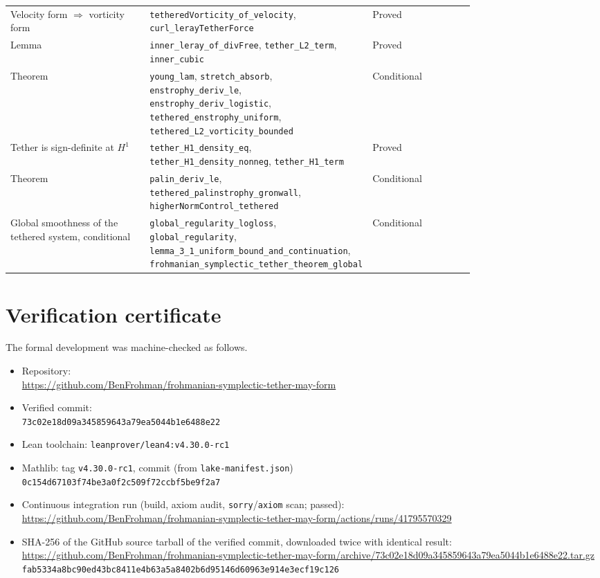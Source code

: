 \documentclass[11pt]{article}
\theoremstyle{definition}
\theoremstyle{remark}
\begin{document}
{\begin{longtable}{p{0.3\linewidth}p{0.48\linewidth}l}
Velocity form $\Rightarrow$ vorticity form & \texttt{tetheredVorticity\_of\_velocity}, \texttt{curl\_lerayTetherForce} & Proved\\
Lemma & \texttt{inner\_leray\_of\_divFree}, \texttt{tether\_L2\_term}, \texttt{inner\_cubic} & Proved\\
Theorem & \texttt{young\_lam}, \texttt{stretch\_absorb}, \texttt{enstrophy\_deriv\_le}, \texttt{enstrophy\_deriv\_logistic}, \texttt{tethered\_enstrophy\_uniform}, \texttt{tethered\_L2\_vorticity\_bounded} & Conditional\\
Tether is sign-definite at $H^1$ & \texttt{tether\_H1\_density\_eq}, \texttt{tether\_H1\_density\_nonneg}, \texttt{tether\_H1\_term} & Proved\\
Theorem & \texttt{palin\_deriv\_le}, \texttt{tethered\_palinstrophy\_gronwall}, \texttt{higherNormControl\_tethered} & Conditional\\
Global smoothness of the tethered system, conditional & \texttt{global\_regularity\_logloss}, \texttt{global\_regularity}, \texttt{lemma\_3\_1\_uniform\_bound\_and\_continuation}, \texttt{frohmanian\_symplectic\_tether\_theorem\_global} & Conditional\\
\hline\end{longtable}}
\appendix
\section{Verification certificate}\label{app:verification-certificate}

The formal development was machine-checked as follows.

{\raggedright
\begin{itemize}
\item Repository:\\ {\footnotesize\url{https://github.com/BenFrohman/frohmanian-symplectic-tether-may-form}}
\item Verified commit:\\ {\footnotesize\texttt{73c02e18d09a345859643a79ea5044b1e6488e22}}
\item Lean toolchain: \texttt{leanprover/lean4:v4.30.0-rc1}
\item Mathlib: tag \texttt{v4.30.0-rc1}, commit (from \texttt{lake-manifest.json})\\ {\footnotesize\texttt{0c154d67103f74be3a0f2c509f72ccbf5be9f2a7}}
\item Continuous integration run (build, axiom audit, \texttt{sorry}/\texttt{axiom} scan; passed):\\ {\footnotesize\url{https://github.com/BenFrohman/frohmanian-symplectic-tether-may-form/actions/runs/41795570329}}
\item SHA-256 of the GitHub source tarball of the verified commit, downloaded twice with identical result:\\ {\footnotesize\url{https://github.com/BenFrohman/frohmanian-symplectic-tether-may-form/archive/73c02e18d09a345859643a79ea5044b1e6488e22.tar.gz}}\\
{\footnotesize\texttt{fab5334a8bc90ed43bc8411e4b63a5a8402b6d95146d60963e914e3ecf19c126}}
\end{itemize}\par}
\end{document}
